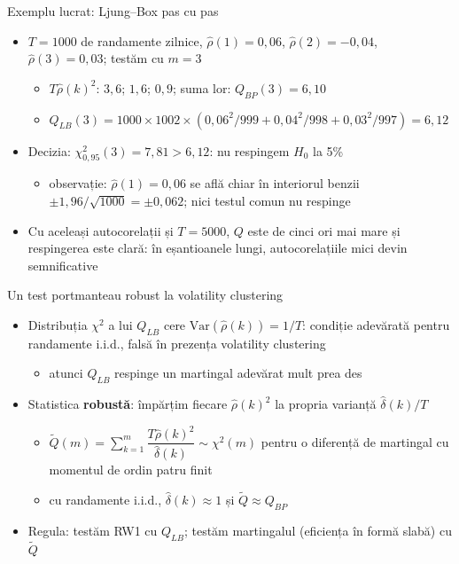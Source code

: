 \begin{frame}{Exemplu lucrat: Ljung--Box pas cu pas}
\itemsize{\small}
\begin{itemize}
    \item $T = 1000$ de randamente zilnice, $\hat\rho(1) = 0{,}06$, $\hat\rho(2) = -0{,}04$, $\hat\rho(3) = 0{,}03$; testăm cu $m = 3$
    \begin{itemize}
        \item $T\hat\rho(k)^2$: $3{,}6$; $1{,}6$; $0{,}9$; suma lor: $Q_{BP}(3) = 6{,}10$
        \item $Q_{LB}(3) = 1000 \times 1002 \times (0{,}06^2/999 + 0{,}04^2/998 + 0{,}03^2/997) = 6{,}12$
    \end{itemize}
    \item Decizia: $\chi^2_{0{,}95}(3) = 7{,}81 > 6{,}12$: nu respingem $H_0$ la 5\%
    \begin{itemize}
        \item observație: $\hat\rho(1) = 0{,}06$ se află chiar în interiorul benzii $\pm 1{,}96/\sqrt{1000} = \pm 0{,}062$; nici testul comun nu respinge
    \end{itemize}
    \item Cu aceleași autocorelații și $T = 5000$, $Q$ este de cinci ori mai mare și respingerea este clară: în eșantioanele lungi, autocorelațiile mici devin semnificative
\end{itemize}
\end{frame}

\begin{frame}{Un test portmanteau robust la volatility clustering}
\itemsize{\small}
\begin{itemize}
    \item Distribuția $\chi^2$ a lui $Q_{LB}$ cere $\mathrm{Var}(\hat\rho(k)) = 1/T$: condiție adevărată pentru randamente i.i.d., falsă în prezența volatility clustering
    \begin{itemize}
        \item atunci $Q_{LB}$ respinge un martingal adevărat mult prea des
    \end{itemize}
    \item Statistica \textbf{robustă}: împărțim fiecare $\hat\rho(k)^2$ la propria varianță $\hat\delta(k)/T$ 
    \begin{itemize}
        \item $\tilde Q(m) = \sum_{k=1}^{m} \dfrac{T\hat\rho(k)^2}{\hat\delta(k)} \sim \chi^2(m)$ pentru o diferență de martingal cu momentul de ordin patru finit
        \item cu randamente i.i.d., $\hat\delta(k) \approx 1$ și $\tilde Q \approx Q_{BP}$
    \end{itemize}
    \item Regula: testăm RW1 cu $Q_{LB}$; testăm martingalul (eficiența în formă slabă) cu $\tilde Q$
\end{itemize}
\end{frame}


